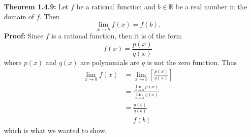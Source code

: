 \documentclass{article}
\begin{document}
	\textbf{Theorem 1.4.9:} Let $f$ be a rational function and $b \in \mathbb{R}$ be a real number in the domain of $f$. Then
	$$\lim_{x \to b}{f(x)} = f(b).$$
	\textbf{Proof:}
	Since $f$ is a rational function, then it is of the form
	$$f(x) = \frac{p(x)}{q(x)}$$
	where $p(x)$ and $q(x)$ are polynomials are $q$ is not the zero function. Thus
	\begin{align*}
		\lim_{x \to b}{f(x)} &= \lim_{x \to b}{\left[\frac{p(x)}{q(x)}\right]} \\
							 &= \frac{\lim_{x \to b}{p(x)}}{{\lim_{x \to b}q(x)}} \tag{Theorem 1.4.5} \\
							 &= \frac{p(b)}{q(b)} \tag{Theorem 1.4.8} \\
							 &= f(b) \tag{$b$ is in domain}
	\end{align*}
	which is what we wanted to show.
\end{document}
